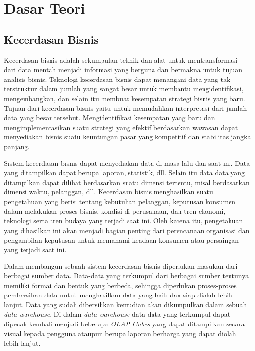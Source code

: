 \chapter{Dasar Teori}
\label{chap:dasar_teori}
	
\section{Kecerdasan Bisnis}
\label{sec:kecerdasan_bisnis}
Kecerdasan bisnis adalah sekumpulan teknik dan alat untuk mentransformasi dari data mentah menjadi informasi yang berguna dan bermakna untuk tujuan analisis bisnis. Teknologi kecerdasan bisnis dapat menangani data yang tak terstruktur dalam jumlah yang sangat besar untuk membantu mengidentifikasi, mengembangkan, dan selain itu membuat kesempatan strategi bisnis yang baru. Tujuan dari kecerdasan bisnis yaitu untuk memudahkan interpretasi dari jumlah data yang besar tersebut. Mengidentifikasi kesempatan yang baru dan mengimplementasikan suatu strategi yang efektif berdasarkan wawasan dapat menyediakan bisnis suatu keuntungan pasar yang kompetitif dan stabilitas jangka panjang. \cite{rud2009business}

Sistem kecerdasan bisnis dapat menyediakan data di masa lalu dan saat ini. Data yang ditampilkan dapat berupa laporan, statistik, dll. Selain itu data data yang ditampilkan dapat dilihat berdasarkan suatu dimensi tertentu, misal berdasarkan dimensi waktu, pelanggan, dll. Kecerdasan bisnis menghasilkan suatu pengetahuan yang berisi tentang kebutuhan pelanggan, keputusan konsumen dalam melakukan proses bisnis, kondisi di perusahaan, dan tren ekonomi, teknologi serta tren budaya yang terjadi saat ini. Oleh karena itu, pengetahuan yang dihasilkan ini akan menjadi bagian penting dari perencanaan organisasi dan pengambilan keputusan untuk memahami keadaan konsumen atau persaingan yang terjadi saat ini.

Dalam membangun sebuah sistem kecerdasan bisnis diperlukan masukan dari berbagai sumber data. Data-data yang terkumpul dari berbagai sumber tentunya memiliki format dan bentuk yang berbeda, sehingga diperlukan proses-proses pembersihan data untuk menghasilkan data yang baik dan siap diolah lebih lanjut. Data yang sudah dibersihkan kemudian akan dikumpulkan dalam sebuah \textit{data warehouse}. Di dalam \textit{data warehouse} data-data yang terkumpul dapat dipecah kembali menjadi beberapa \textit{OLAP Cubes} yang dapat ditampilkan secara visual kepada pengguna ataupun berupa laporan berharga yang dapat diolah lebih lanjut.

